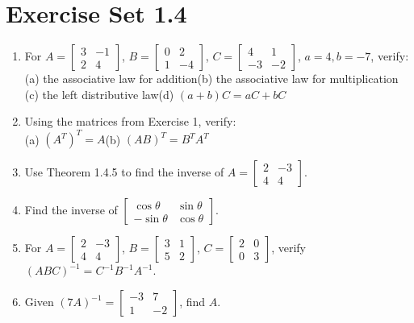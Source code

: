 \documentclass{article}
\theoremstyle{mystyle}
\begin{document}
\section*{Exercise Set 1.4}
\begin{enumerate}
    \item[1.] For $A=\begin{bmatrix}3&-1\\2&4\end{bmatrix}$, $B=\begin{bmatrix}0&2\\1&-4\end{bmatrix}$, $C=\begin{bmatrix}4&1\\-3&-2\end{bmatrix}$, $a=4,b=-7$, verify:\\
    (a) the associative law for addition\quad (b) the associative law for multiplication\\
    (c) the left distributive law\quad (d) $(a+b)C=aC+bC$

    \item[3.] Using the matrices from Exercise 1, verify:\\
    (a) $(A^T)^T=A$\qquad (b) $(AB)^T=B^TA^T$

    \item[5.] Use Theorem 1.4.5 to find the inverse of $A=\begin{bmatrix}2&-3\\4&4\end{bmatrix}$.

    \item[10.] Find the inverse of $\begin{bmatrix}\cos\theta&\sin\theta\\-\sin\theta&\cos\theta\end{bmatrix}$.

    \item[13.] For $A=\begin{bmatrix}2&-3\\4&4\end{bmatrix}$, $B=\begin{bmatrix}3&1\\5&2\end{bmatrix}$, $C=\begin{bmatrix}2&0\\0&3\end{bmatrix}$, verify $(ABC)^{-1}=C^{-1}B^{-1}A^{-1}$.

    \item[15.] Given $(7A)^{-1}=\begin{bmatrix}-3&7\\1&-2\end{bmatrix}$, find $A$.


\end{enumerate}
\end{document}
